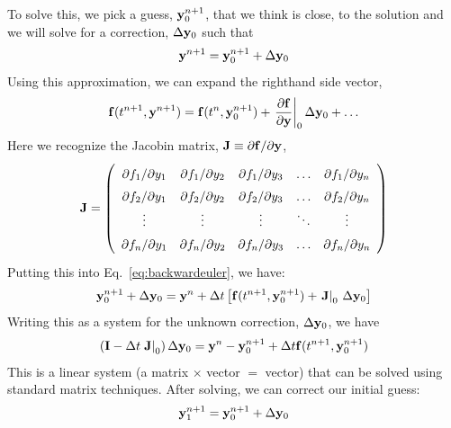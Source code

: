 To solve this, we pick a guess, ${\bf y}^{n+1}_0$, that we think is
close, to the solution and we will solve for a correction, $\Delta
{\bf y}_0$ such that
\begin{equation}
  {\bf y}^{n+1} = {\bf y}^{n+1}_0 + \Delta {\bf y}_0
\end{equation}
Using this approximation, we can expand the righthand side vector,
\begin{equation}
{\bf f}(t^{n+1},{\bf y}^{n+1}) = {\bf f}(t^n, {\bf y}^{n+1}_0) +
     \left . \frac{\partial {\bf f}}{\partial {\bf y}} \right |_0 \Delta {\bf y}_0 + \ldots 
\end{equation} 
Here we recognize the Jacobin matrix, ${\bf J} \equiv \partial {\bf
  f}/\partial {\bf y}$,
\begin{equation}
\renewcommand\arraystretch{1.5}
{\bf J} = \left ( 
\begin{array}{ccccc}
\partial f_1/\partial y_1 & \partial f_1/\partial y_2 & 
\partial f_1/\partial y_3 & \ldots & \partial f_1/\partial y_n \\
%
\partial f_2/\partial y_1 & \partial f_2/\partial y_2 & 
\partial f_2/\partial y_3 & \ldots & \partial f_2/\partial y_n \\
%
\vdots  & \vdots & \vdots & \ddots & \vdots \\
%
\partial f_n/\partial y_1 & \partial f_n/\partial y_2 & 
\partial f_n/\partial y_3 & \ldots & \partial f_n/\partial y_n \\
\end{array}
\right )
\end{equation}
%
Putting this into Eq.~\ref{eq:backwardeuler}, we have:
\begin{equation}
{\bf y}^{n+1}_0 + \Delta {\bf y}_0 = {\bf y}^n + \Delta t \left [
  {\bf f}(t^{n+1}, {\bf y}^{n+1}_0) +
     \left .{\bf J}\right |_0\, \Delta {\bf y}_0 \right ]
\end{equation}
Writing this as a system for the unknown correction, $\Delta {\bf
  y}_0$, we have
\begin{equation}
  \left ({\bf I} - \Delta t \left . {\bf J} \right |_0 \right ) \Delta {\bf y}_0 =
   {\bf y}^n - {\bf y}_0^{n+1} + \Delta t {\bf f}(t^{n+1}, {\bf y}^{n+1}_0)
\end{equation}
This is a linear system (a matrix $\times$ vector $=$ vector)
that can be solved using standard matrix techniques.  After solving,
we can correct our initial guess:
\begin{equation}
  {\bf y}^{n+1}_1 = {\bf y}^{n+1}_0 + \Delta {\bf y}_0
\end{equation}

